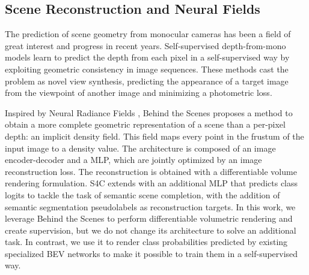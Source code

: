 \subsection{Scene Reconstruction and Neural Fields}
The prediction of scene geometry from monocular cameras has been a field of great interest and progress in recent years. Self-supervised depth-from-mono models \cite{godard_digging_2019} learn to predict the depth from each pixel in a self-supervised way by exploiting geometric consistency in image sequences. These methods cast the problem as novel view synthesis, predicting the appearance of a target image from the viewpoint of another image and minimizing a photometric loss.

Inspired by Neural Radiance Fields \cite{mildenhall_nerf_2020}, Behind the Scenes \cite{wimbauer_behind_2023} proposes a method to obtain a more complete geometric representation of a scene than a per-pixel depth: an implicit density field. This field maps every point in the frustum of the input image to a density value.
The architecture is composed of an image encoder-decoder and a MLP, which are jointly optimized by an image reconstruction loss. The reconstruction is obtained with a differentiable volume rendering formulation. S4C \cite{hayler_s4c_2023} extends \cite{wimbauer_behind_2023} with an additional MLP that predicts class logits to tackle the task of semantic scene completion, with the addition of semantic segmentation pseudolabels as reconstruction targets. In this work, we leverage Behind the Scenes to perform differentiable volumetric rendering and create supervision, but we do not change its architecture to solve an additional task. In contrast, we use it to render class probabilities predicted by existing specialized BEV networks to make it possible to train them in a self-supervised way.
